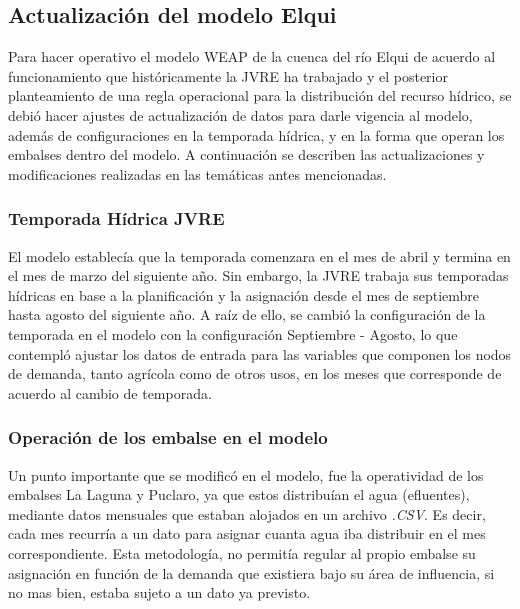 \documentclass[11pt,]{article}
\begin{document}
		\subsection{Actualización del modelo Elqui}\bigskip
		
Para hacer operativo el modelo WEAP de la cuenca del río Elqui de acuerdo al funcionamiento que históricamente la JVRE ha trabajado y el posterior planteamiento de una regla operacional para la distribución del recurso hídrico, se debió hacer ajustes de actualización de datos para darle vigencia al modelo, además de configuraciones en la temporada hídrica, y en la forma que operan los embalses dentro del modelo. A continuación se describen las actualizaciones y modificaciones realizadas en las temáticas antes mencionadas.\\
		
			\subsubsection{Temporada Hídrica JVRE}		
		
		El modelo establecía que la temporada comenzara en el mes de abril y termina en el mes de marzo del siguiente año. Sin embargo, la JVRE trabaja sus temporadas hídricas en base a la planificación y la asignación desde el mes de septiembre hasta agosto del siguiente año. A raíz de ello, se cambió la configuración de la temporada en el modelo con la configuración Septiembre - Agosto, lo que contempló ajustar los datos de entrada para las variables que componen los nodos de demanda, tanto agrícola como de otros usos, en los meses que corresponde de acuerdo al cambio de temporada.\\
		
			\subsubsection{Operación de los embalse en el modelo}		
		
		Un punto importante que se modificó en el modelo, fue la operatividad de los embalses La Laguna y Puclaro, ya que estos distribuían el agua (efluentes), mediante datos mensuales que estaban alojados en un archivo \textit{.CSV}. Es decir, cada mes recurría a un dato para asignar cuanta agua iba distribuir en el mes correspondiente. Esta metodología, no permitía regular al propio embalse su asignación en función de la demanda que existiera bajo su área de influencia, si no mas bien, estaba sujeto a un dato ya previsto. \\
		
\end{document}
